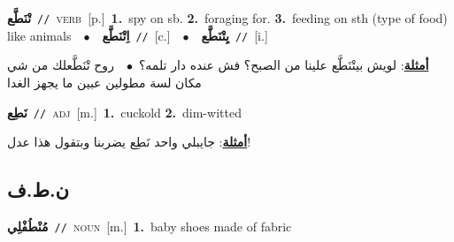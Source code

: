\documentclass[10pt,a4paper,twoside]{article} %
\begin{document}
\begin{multicols}{2}
{\setlength\topsep{0pt}\textbf{\foreignlanguage{arabic}{تْنَطَّع}}\ {\color{gray}\texttt{//}\color{black}}\ \textsc{verb}\ [p.]\ \textbf{1.}~spy on sb.  \textbf{2.}~foraging for.  \textbf{3.}~feeding on sth (type of food) like animals\ \ $\bullet$\ \ \setlength\topsep{0pt}\textbf{\foreignlanguage{arabic}{اِتْنَطَّع}}\ {\color{gray}\texttt{//}\color{black}}\ [c.]\ \ $\bullet$\ \ \setlength\topsep{0pt}\textbf{\foreignlanguage{arabic}{يِتْنَطَّع}}\ {\color{gray}\texttt{//}\color{black}}\ [i.]\  \begin{flushright}\color{gray}\foreignlanguage{arabic}{\textbf{\underline{\foreignlanguage{arabic}{أمثلة}}}: لويش بيتْنَطَّع علينا من الصبح؟ فش عنده دار تلمه؟\ $\bullet$\ \  روح تْنَطَّعلك من شي مكان لسة مطولين عبين ما يجهز الغدا}\end{flushright}\color{black}} \vspace{2mm}

{\setlength\topsep{0pt}\textbf{\foreignlanguage{arabic}{نَطِع}}\ {\color{gray}\texttt{//}\color{black}}\ \textsc{adj}\ [m.]\ \textbf{1.}~cuckold  \textbf{2.}~dim-witted\  \begin{flushright}\color{gray}\foreignlanguage{arabic}{\textbf{\underline{\foreignlanguage{arabic}{أمثلة}}}: جايبلي واحد نَطِع يضربنا وبتقول هذا عدل!}\end{flushright}\color{black}} \vspace{2mm}

\vspace{-3mm}
\subsection*{\color{blue}\foreignlanguage{arabic}{ن.ط.ف}\color{blue}{}} 

{\setlength\topsep{0pt}\textbf{\foreignlanguage{arabic}{مُنْطُفْلِي}}\ {\color{gray}\texttt{//}\color{black}}\ \textsc{noun}\ [m.]\ \textbf{1.}~baby shoes made of fabric\ } \vspace{2mm}


\end{multicols}
\end{document}
